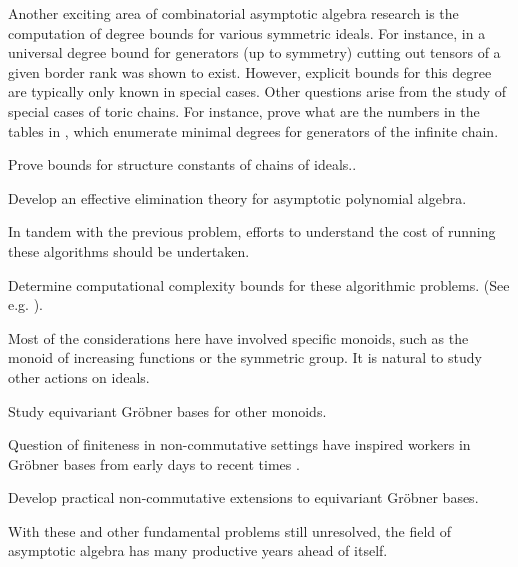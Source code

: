Another exciting area of combinatorial asymptotic algebra research is the computation of degree bounds for various symmetric ideals. 
For instance, in \cite{draisma2014bounded, Draisma12f} a universal degree bound for generators (up to symmetry) cutting out tensors of a given border rank was shown to exist.  However, explicit bounds for this degree are typically only known in special cases.  Other questions arise from the study of special cases of toric chains.  For instance, prove what are the numbers in the tables in \cite{KKL:equivariant-markov, Hillar13, hillar2016corrigendum}, which enumerate minimal degrees for generators of the infinite chain.

\begin{problem}
Prove bounds for structure constants of chains of ideals..
\end{problem}



\begin{problem}
Develop an effective elimination theory for asymptotic polynomial algebra.
\end{problem}

In tandem with the previous problem, efforts to understand the cost of running these algorithms should be undertaken.

\begin{problem}
Determine computational complexity bounds for these algorithmic problems.  (See e.g. \cite{yap2000fundamental}).
\end{problem}

Most of the considerations here have involved specific monoids, such as the monoid of increasing functions or the symmetric group.  It is natural to study other actions on ideals.

\begin{problem}
Study equivariant Gr\"obner bases for other monoids.
\end{problem}

Question of finiteness in non-commutative settings have inspired workers in Gr\"obner bases from early days \cite{shirshov1962some, bokut1976embeddings, bergman1978diamond} to recent times \cite{la2009letterplace}.

\begin{problem}
Develop practical non-commutative extensions to equivariant Gr\"obner bases.
\end{problem}

With these and other fundamental problems still unresolved, the field of asymptotic algebra has many productive years ahead of itself.

